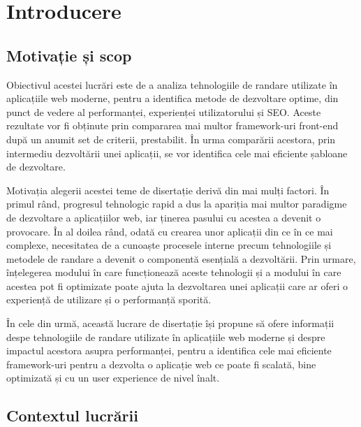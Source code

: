 \documentclass[12pt, a4paper]{report}
\begin{document}
\tableofcontents{}
\listoffigures{}

\newpage{}

\chapter{Introducere}

\setcounter{page}{1}


\section{Motivație și scop}

Obiectivul acestei lucrări este de a analiza tehnologiile de randare utilizate în aplicațiile web moderne, pentru a identifica metode de dezvoltare optime, din punct de vedere al performanței, experienței utilizatorului și SEO. Aceste rezultate vor fi obținute prin compararea mai multor framework-uri front-end după un anumit set de criterii, prestabilit. În urma comparării acestora, prin intermediu dezvoltării unei aplicații, se vor identifica cele mai eficiente șabloane de dezvoltare.

Motivația alegerii acestei teme de disertație derivă din mai mulți factori. În primul rând, progresul tehnologic rapid a dus la apariția mai multor paradigme de dezvoltare a aplicațiilor web, iar ținerea pasului cu acestea a devenit o provocare. În al doilea rând, odată cu crearea unor aplicații din ce în ce mai complexe, necesitatea de a cunoaște procesele interne precum tehnologiile și metodele de randare a devenit o componentă esențială a dezvoltării. Prin urmare, înțelegerea modului în care funcționează aceste tehnologii și a modului în care acestea pot fi optimizate poate ajuta la dezvoltarea unei aplicații care ar oferi o experiență de utilizare și o performanță sporită.

În cele din urmă, această lucrare de disertație își propune să ofere informații despe tehnologiile de randare utilizate în aplicațiile web moderne și despre impactul acestora asupra performanței, pentru a identifica cele mai eficiente framework-uri pentru a dezvolta o aplicație web ce poate fi scalată, bine optimizată și cu un user experience de nivel înalt.


\section{Contextul lucrării}
\end{document}
